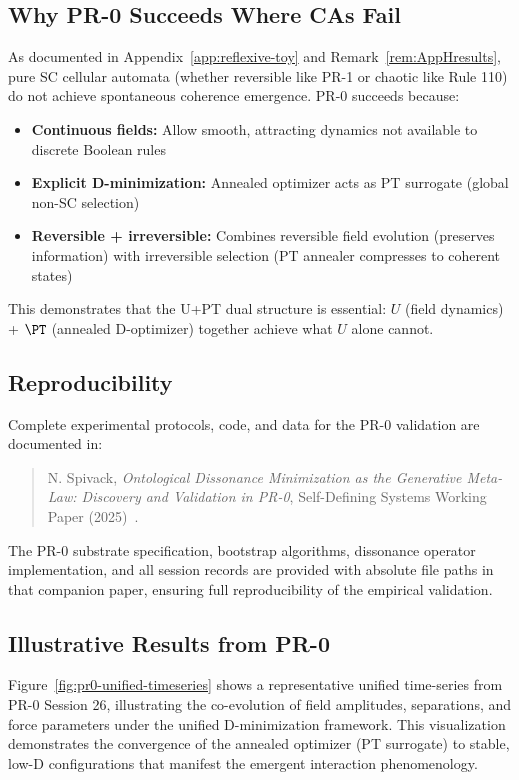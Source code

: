 \subsection{Why PR-0 Succeeds Where CAs Fail}

As documented in Appendix~\ref{app:reflexive-toy} and Remark~\ref{rem:AppHresults}, pure SC cellular automata (whether reversible like PR-1 or chaotic like Rule 110) do not achieve spontaneous coherence emergence. PR-0 succeeds because:

\begin{itemize}
  \item \textbf{Continuous fields:} Allow smooth, attracting dynamics not available to discrete Boolean rules
  \item \textbf{Explicit D-minimization:} Annealed optimizer acts as PT surrogate (global non-SC selection)
  \item \textbf{Reversible + irreversible:} Combines reversible field evolution (preserves information) with irreversible selection (PT annealer compresses to coherent states)
\end{itemize}

This demonstrates that the U+PT dual structure is essential: \(U\) (field dynamics) + \(\PT\) (annealed D-optimizer) together achieve what \(U\) alone cannot.

\subsection{Reproducibility}

Complete experimental protocols, code, and data for the PR-0 validation are documented in:
\begin{quote}
N. Spivack, \emph{Ontological Dissonance Minimization as the Generative Meta-Law: Discovery and Validation in PR-0}, Self-Defining Systems Working Paper (2025)~\cite{SpivackSDS_PR0}.
\end{quote}

The PR-0 substrate specification, bootstrap algorithms, dissonance operator implementation, and all session records are provided with absolute file paths in that companion paper, ensuring full reproducibility of the empirical validation.

\subsection{Illustrative Results from PR-0}

Figure~\ref{fig:pr0-unified-timeseries} shows a representative unified time-series from PR-0 Session 26, illustrating the co-evolution of field amplitudes, separations, and force parameters under the unified D-minimization framework. This visualization demonstrates the convergence of the annealed optimizer (PT surrogate) to stable, low-D configurations that manifest the emergent interaction phenomenology.

